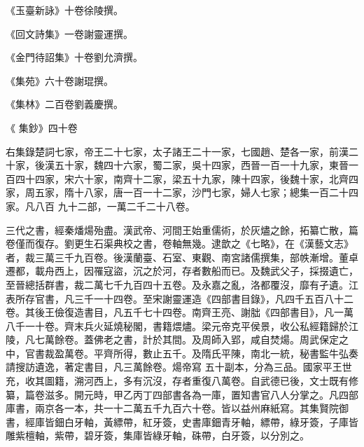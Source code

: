 \begin{pinyinscope}
 《玉臺新詠》十卷徐陵撰。



 《回文詩集》一卷謝靈運撰。



 《金門待詔集》十卷劉允濟撰。



 《集苑》六十卷謝琨撰。



 《集林》二百卷劉義慶撰。



 《
 集鈔》四十卷



 右集錄楚詞七家，帝王二十七家，太子諸王二十一家，七國趙、楚各一家，前漢二十家，後漢五十家，魏四十六家，蜀二家，吳十四家，西晉一百一十九家，東晉一百四十四家，宋六十家，南齊十二家，梁五十九家，陳十四家，後魏十家，北齊四家，周五家，隋十八家，唐一百一十二家，沙門七家，婦人七家；總集一百二十四家。凡八百
 九十二部，一萬二千二十八卷。



 三代之書，經秦燔煬殆盡。漢武帝、河間王始重儒術，於灰燼之餘，拓纂亡散，篇卷僅而復存。劉更生石渠典校之書，卷軸無幾。逮歆之《七略》，在《漢藝文志》者，裁三萬三千九百卷。後漢蘭臺、石室、東觀、南宮諸儒撰集，部帙漸增。董卓遷都，載舟西上，因罹寇盜，沉之於河，存者數船而已。及魏武父子，採掇遺亡，至晉總括群書，裁二萬七千九百四十五卷。及永嘉之亂，洛都覆沒，靡有孑遺。江
 表所存官書，凡三千一十四卷。至宋謝靈運造《四部書目錄》，凡四千五百八十二卷。其後王儉復造書目，凡五千七十四卷。南齊王亮、謝朏《四部書目》，凡一萬八千一十卷。齊末兵火延燒秘閣，書籍煨燼。梁元帝克平侯景，收公私經籍歸於江陵，凡七萬餘卷。蓋佛老之書，計於其間。及周師入郢，咸自焚煬。周武保定之中，官書裁盈萬卷。平齊所得，數止五千。及隋氏平陳，南北一統，秘書監牛弘奏請搜訪遺逸，著定書目，凡三萬餘卷。煬帝寫
 五十副本，分為三品。國家平王世充，收其圖籍，溯河西上，多有沉沒，存者重復八萬卷。自武德已後，文士既有修纂，篇卷滋多。開元時，甲乙丙丁四部書各為一庫，置知書官八人分掌之。凡四部庫書，兩京各一本，共一十二萬五千九百六十卷。皆以益州麻紙寫。其集賢院御書，經庫皆鈿白牙軸，黃縹帶，紅牙簽，史書庫鈿青牙軸，縹帶，綠牙簽，子庫皆雕紫檀軸，紫帶，碧牙簽，集庫皆綠牙軸，硃帶，白牙簽，以分別之。



\end{pinyinscope}